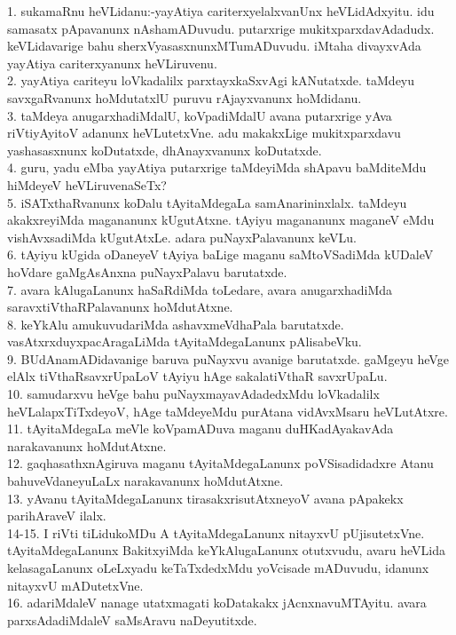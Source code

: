 \documentclass{article}
\begin{document}
1. sukamaRnu heVLidanu:-yayAtiya cariterxyelalxvanUnx heVLidAdxyitu. idu samasatx pApavanunx nAshamADuvudu. putarxrige mukitxparxdavAdadudx. keVLidavarige bahu sherxVyasasxnunxMTumADuvudu. iMtaha divayxvAda yayAtiya cariterxyanunx heVLiruvenu.\\
2. yayAtiya cariteyu loVkadalilx parxtayxkaSxvAgi kANutatxde. taMdeyu savxgaRvanunx hoMdutatxlU puruvu rAjayxvanunx hoMdidanu.\\
3. taMdeya anugarxhadiMdalU, koVpadiMdalU avana putarxrige yAva riVtiyAyitoV adanunx heVLutetxVne. adu makakxLige mukitxparxdavu yashasasxnunx koDutatxde, dhAnayxvanunx koDutatxde.\\
4. guru, yadu eMba yayAtiya putarxrige taMdeyiMda shApavu baMditeMdu hiMdeyeV heVLiruvenaSeTx?\\
5. iSATxthaRvanunx koDalu tAyitaMdegaLa samAnarininxlalx. taMdeyu akakxreyiMda magananunx kUgutAtxne. tAyiyu magananunx maganeV eMdu vishAvxsadiMda kUgutAtxLe. adara puNayxPalavanunx keVLu.\\
6. tAyiyu kUgida oDaneyeV tAyiya baLige maganu saMtoVSadiMda kUDaleV hoVdare gaMgAsAnxna puNayxPalavu barutatxde.\\
7. avara kAlugaLanunx haSaRdiMda toLedare, avara anugarxhadiMda saravxtiVthaRPalavanunx hoMdutAtxne.\\
8. keYkAlu amukuvudariMda ashavxmeVdhaPala barutatxde. vasAtxrxduyxpacAragaLiMda tAyitaMdegaLanunx pAlisabeVku.\\
9. BUdAnamADidavanige baruva puNayxvu avanige barutatxde. gaMgeyu heVge elAlx tiVthaRsavxrUpaLoV tAyiyu hAge sakalatiVthaR savxrUpaLu.\\
10. samudarxvu heVge bahu puNayxmayavAdadedxMdu loVkadalilx heVLalapxTiTxdeyoV, hAge taMdeyeMdu purAtana vidAvxMsaru heVLutAtxre.\\
11. tAyitaMdegaLa meVle koVpamADuva maganu duHKadAyakavAda narakavanunx hoMdutAtxne.\\
12. gaqhasathxnAgiruva maganu tAyitaMdegaLanunx poVSisadidadxre Atanu bahuveVdaneyuLaLx narakavanunx hoMdutAtxne.\\
13. yAvanu tAyitaMdegaLanunx tirasakxrisutAtxneyoV avana pApakekx parihAraveV ilalx.\\
14-15. I riVti tiLidukoMDu A tAyitaMdegaLanunx nitayxvU pUjisutetxVne. tAyitaMdegaLanunx BakitxyiMda keYkAlugaLanunx otutxvudu, avaru heVLida kelasagaLanunx oLeLxyadu keTaTxdedxMdu yoVcisade mADuvudu, idanunx nitayxvU mADutetxVne.\\
16. adariMdaleV nanage utatxmagati koDatakakx jAcnxnavuMTAyitu. avara parxsAdadiMdaleV saMsAravu naDeyutitxde.\\
\end{document}
